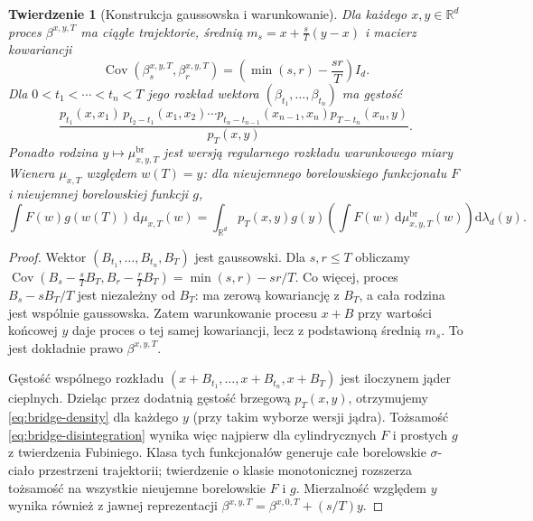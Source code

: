 \documentclass[11pt,a4paper,oneside]{report}
\numberwithin{equation}{chapter}
\theoremstyle{plain}
\newtheorem{twierdzenie}{Twierdzenie}[chapter]
\theoremstyle{definition}
\theoremstyle{remark}
\newcommand{\R}{\mathbb{R}}
\newcommand{\dd}{\mathrm{d}}
\begin{document}
\begin{twierdzenie}[Konstrukcja gaussowska i warunkowanie]
\label{th:bridge-conditional}
Dla każdego $x,y\in\R^d$ proces $\beta^{x,y,T}$ ma
ciągłe trajektorie, średnią
$m_s=x+\frac{s}{T}(y-x)$ i macierz kowariancji
\[
\operatorname{Cov}(\beta_s^{x,y,T},\beta_r^{x,y,T})
 =\left(\min(s,r)-\frac{sr}{T}\right)I_d.
\]
Dla $0<t_1<\cdots<t_n<T$ jego rozkład wektora
$(\beta_{t_1},\ldots,\beta_{t_n})$ ma gęstość
\[
\frac{p_{t_1}(x,x_1)\,p_{t_2-t_1}(x_1,x_2)
 \cdots p_{t_n-t_{n-1}}(x_{n-1},x_n)
 p_{T-t_n}(x_n,y)}{p_T(x,y)}.
\tag{15.1}\label{eq:bridge-density}
\]
Ponadto rodzina $y\mapsto\mu_{x,y,T}^{\mathrm{br}}$
jest wersją regularnego rozkładu warunkowego miary Wienera
$\mu_{x,T}$ względem $w(T)=y$: dla nieujemnego borelowskiego
funkcjonału $F$ i nieujemnej borelowskiej funkcji $g$,
\[
 \int F(w)g(w(T))\,\dd\mu_{x,T}(w)
 =\int_{\R^d}p_T(x,y)g(y)
    \left(\int F(w)\,\dd\mu_{x,y,T}^{\mathrm{br}}(w)\right)
    \dd\lambda_d(y).
\tag{15.2}\label{eq:bridge-disintegration}
\]
\end{twierdzenie}
\begin{proof}
Wektor $(B_{t_1},\ldots,B_{t_n},B_T)$ jest gaussowski.
Dla $s,r\le T$ obliczamy
$\operatorname{Cov}(B_s-\frac sT B_T,
B_r-\frac rT B_T)=\min(s,r)-sr/T$.
Co więcej, proces $B_s-sB_T/T$ jest niezależny od $B_T$:
ma zerową kowariancję z $B_T$, a cała rodzina jest wspólnie
gaussowska. Zatem warunkowanie procesu $x+B$ przy wartości
końcowej $y$ daje proces o tej samej kowariancji, lecz z
podstawioną średnią $m_s$. To jest dokładnie prawo
$\beta^{x,y,T}$.

Gęstość wspólnego rozkładu
$(x+B_{t_1},\ldots,x+B_{t_n},x+B_T)$ jest iloczynem
jąder cieplnych. Dzieląc przez dodatnią gęstość brzegową
$p_T(x,y)$, otrzymujemy \eqref{eq:bridge-density} dla
każdego $y$ (przy takim wyborze wersji jądra).
Tożsamość \eqref{eq:bridge-disintegration} wynika więc
najpierw dla cylindrycznych $F$ i prostych $g$ z twierdzenia
Fubiniego. Klasa tych funkcjonałów generuje całe borelowskie
$\sigma$-ciało przestrzeni trajektorii; twierdzenie o klasie
monotonicznej rozszerza tożsamość na wszystkie nieujemne
borelowskie $F$ i $g$. Mierzalność względem $y$ wynika
również z jawnej reprezentacji
$\beta^{x,y,T}=\beta^{x,0,T}+(s/T)y$.
\end{proof}
\end{document}
